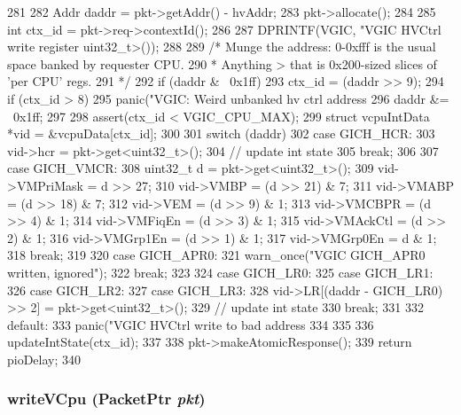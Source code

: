 \begin{DoxyCode}
281 {
282     Addr daddr = pkt->getAddr() - hvAddr;
283     pkt->allocate();
284 
285     int ctx_id = pkt->req->contextId();
286 
287     DPRINTF(VGIC, "VGIC HVCtrl write register %
      uint32_t>());
288 
289     /* Munge the address: 0-0xfff is the usual space banked by requester CPU.
290      * Anything > that is 0x200-sized slices of 'per CPU' regs.
291      */
292     if (daddr & ~0x1ff) {
293         ctx_id = (daddr >> 9);
294         if (ctx_id > 8)
295             panic("VGIC: Weird unbanked hv ctrl address %
296         daddr &= ~0x1ff;
297     }
298     assert(ctx_id < VGIC_CPU_MAX);
299     struct vcpuIntData *vid = &vcpuData[ctx_id];
300 
301     switch (daddr) {
302       case GICH_HCR:
303         vid->hcr = pkt->get<uint32_t>();
304         // update int state
305         break;
306 
307       case GICH_VMCR: {
308           uint32_t d = pkt->get<uint32_t>();
309           vid->VMPriMask = d >> 27;
310           vid->VMBP = (d >> 21) & 7;
311           vid->VMABP = (d >> 18) & 7;
312           vid->VEM = (d >> 9) & 1;
313           vid->VMCBPR = (d >> 4) & 1;
314           vid->VMFiqEn = (d >> 3) & 1;
315           vid->VMAckCtl = (d >> 2) & 1;
316           vid->VMGrp1En = (d >> 1) & 1;
317           vid->VMGrp0En = d & 1;
318       } break;
319 
320       case GICH_APR0:
321         warn_once("VGIC GICH_APR0 written, ignored\n");
322         break;
323 
324       case GICH_LR0:
325       case GICH_LR1:
326       case GICH_LR2:
327       case GICH_LR3:
328         vid->LR[(daddr - GICH_LR0) >> 2] = pkt->get<uint32_t>();
329         // update int state
330         break;
331 
332       default:
333         panic("VGIC HVCtrl write to bad address %
334     }
335 
336     updateIntState(ctx_id);
337 
338     pkt->makeAtomicResponse();
339     return pioDelay;
340 }
\end{DoxyCode}
\hypertarget{classVGic_a289d8279acf224a8745658b053b0c16c}{
\subsubsection[{writeVCpu}]{ writeVCpu ({\bf PacketPtr} {\em pkt})}}
\label{classVGic_a289d8279acf224a8745658b053b0c16c}



